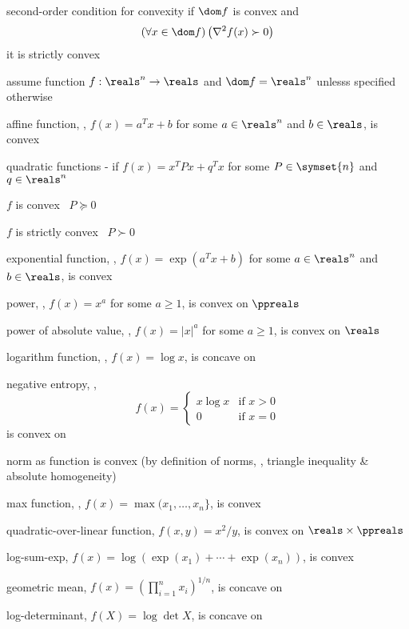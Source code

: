 \documentclass[17pt,landscape]{foils}
\begin{document}
{\begin{mytheorem}{second-order condition for convexity}
	\ibit
	\iitem
		if $\dom f$ is convex and
		$$
			\left(
				\forall x\in \dom f
			\right)
			\left(
				\nabla^2 f(x) \succ 0
			\right)
		$$
		it is strictly convex
	\eit
\end{mytheorem}



\bit
\iitem
	assume function $f:\reals^n\to\reals$
	and $\dom f =\reals^n$
	unlesss specified otherwise

\vitem
	affine function, \ie, $f(x)=a^Tx +b $ for some $a\in\reals^n$ and $b\in\reals$, is convex

\vitem
	quadratic functions
	- if $f(x) = x^T Px + q^Tx$
	for some $P\in\symset{n}$ and $q\in\reals^n$
	\bit
	\item
		$f$ is convex \iaoi\ $P\succeq0$
	\item
		$f$ is strictly convex \iaoi\ $P\succ0$
	\eit

\vitem
	exponential function,
	\ie, $f(x) = \exp(a^Tx+b)$ for some $a\in\reals^n$ and $b\in\reals$,
	is convex

\vitem
	power,
	\ie, $f(x) = x^a$ for some $a\geq1$,
	is convex on $\ppreals$

\vitem
	power of absolute value,
	\ie, $f(x) = |x|^a$ for some $a\geq1$,
	is convex on $\reals$

\vitem
	logarithm function,
	\ie, $f(x) = \log x$,
	is concave on \ppreals\

\vitem
	negative entropy,
	\ie,
	$$
		f(x) = \left\{\begin{array}{ll}
			x\log x & \mbox{if } x >0
			\\
			0 &\mbox{if } x=0
		\end{array}\right.
	$$
	is convex on \preals\

\vitem
	norm as function is convex
	(by definition of norms,
	\ie, triangle inequality \& absolute homogeneity)

\vitem
	max function,
	\ie, $f(x)=\max(x_1,\ldots,x_n\}$,
	is convex

\vitem
	quadratic-over-linear function,
	$f(x,y) = x^2/y$,
	is convex on $\reals\times \ppreals$

\vitem
	log-sum-exp,
	$f(x) = \log(\exp(x_1)+\cdots+\exp(x_n))$,
	is convex

\vitem
	geometric mean,
	$f(x) = (\prod_{i=1}^n x_i )^{1/n}$,
	is concave on \

\vitem
	log-determinant,
	$f(X) = \log \det X$,
	is concave on \
\eit



}
\end{document}
